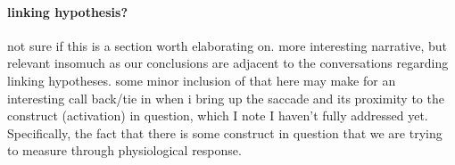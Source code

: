 \documentclass{article}
\newcommand{\xt}{\texttt}%
\begin{document}
\paragraph{linking hypothesis?} not sure if this is a section worth elaborating on. more interesting narrative, but relevant insomuch as our conclusions are adjacent to the conversations regarding linking hypotheses.  some minor inclusion of that here may make for an interesting call back/tie in when i bring up the saccade and its proximity to the construct (activation) in question, which I note I haven't fully addressed yet. Specifically, the fact that there is some construct in question that we are trying to measure through physiological response. 






\end{document}
